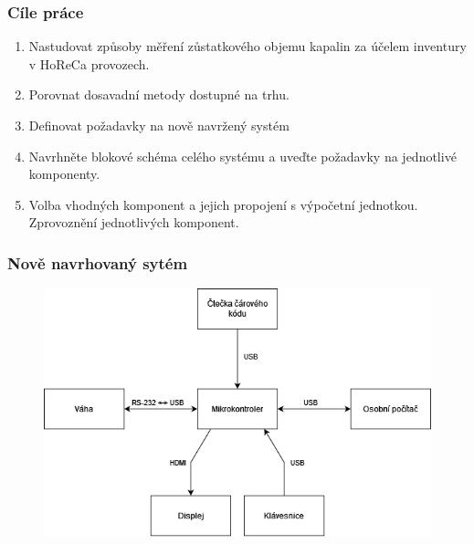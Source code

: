 \documentclass[%
  12pt,       				%
	t,                  %
	aspectratio=1610,   %
	unicode,						%
]{beamer}				    	%
\begin{document}
\begin{frame}
	\frametitle{Cíle práce}
	\begin{enumerate}
			\item Nastudovat způsoby měření zůstatkového objemu kapalin za účelem inventury v HoReCa provozech.
			\item Porovnat dosavadní metody dostupné na trhu.
            \item Definovat požadavky na nově navržený systém
            \item Navrhněte blokové schéma celého systému a uveďte požadavky na jednotlivé komponenty.
            \item Volba vhodných komponent a jejich propojení s výpočetní jednotkou. Zprovoznění jednotlivých komponent.
	\end{enumerate}
\end{frame}

\begin{frame} %
    \frametitle{Nově navrhovaný sytém} %
    
    \begin{figure}%
				\centering
				\includegraphics[width=0.7\columnwidth]{obrazky/Blokové schéma.png}
    \end{figure}
\end{frame}
\end{document}
